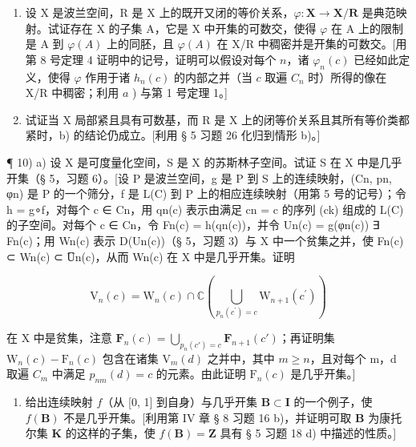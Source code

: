 \begin{enumerate}
\def\labelenumi{\alph{enumi})}
\setcounter{enumi}{1}
\item
  设 X 是波兰空间，R 是 X 上的既开又闭的等价关系，\(\varphi: \mathbf{X} \to \mathbf{X} / \mathbf{R}\) 是典范映射。试证存在 X 的子集 A，它是 X 中开集的可数交，使得 \(\varphi\) 在 A 上的限制是 A 到 \(\varphi(A)\) 上的同胚，且 \(\varphi(A)\) 在 X/R 中稠密并是开集的可数交。{[}用第 8 号定理 4 证明中的记号，证明可以假设对每个 \(n\)，诸 \(\varphi_n(c)\) 已经如此定义，使得 \(\varphi\) 作用于诸 \(h_n(c)\) 的内部之并（当 \(c\) 取遍 \(C_n\) 时）所得的像在 X/R 中稠密；利用 \(a\) ) 与第 1 号定理 1。{]}
\item
  试证当 X 局部紧且具有可数基，而 R 是 X 上的闭等价关系且其所有等价类都紧时，b) 的结论仍成立。{[}利用 § 5 习题 26 化归到情形 b)。{]}
\end{enumerate}

¶ 10) a) 设 X 是可度量化空间，S 是 X 的苏斯林子空间。试证 S 在 X 中是几乎开集（§ 5，习题 6）。{[}设 P 是波兰空间，g 是 P 到 S 上的连续映射，(Cn, pn, φn) 是 P 的一个筛分，f 是 L(C) 到 P 上的相应连续映射（用第 5 号的记号）；令 h = g∘f，对每个 c ∈ Cn，用 qn(c) 表示由满足 cn = c 的序列 (ck) 组成的 L(C) 的子空间。对每个 c ∈ Cn，令 Fn(c) = h(qn(c))，并令 Un(c) = g(φn(c)) ∃ Fn(c)；用 Wn(c) 表示 D(Un(c))（§ 5，习题 3）与 X 中一个贫集之并，使 Fn(c) ⊂ Wn(c) ⊂ U̅n(c)，从而 Wn(c) 在 X 中是几乎开集。证明

\[
\mathrm{V} _ {n} (c) = \mathrm{W} _ {n} (c) \cap \mathbb {C} \left(\bigcup_ {p _ {n} \left(c ^ {\prime}\right) = c} \mathrm{W} _ {n + 1} \left(c ^ {\prime}\right)\right)
\]

在 X 中是贫集，注意 \(\mathbf{F}_n(c) = \bigcup_{p_n(c') = c}\mathbf{F}_{n + 1}(c')\)；再证明集 \(\mathrm{W}_{n}(c)-\mathrm{F}_{n}(c)\) 包含在诸集 \(\mathrm{V}_{m}(d)\) 之并中，其中 \(m\geqslant n\)，且对每个 m，d 取遍 \(C_{m}\) 中满足 \(p_{nm}(d)=c\) 的元素。由此证明 \(\mathrm{F}_{n}(c)\) 是几乎开集。{]}

\begin{enumerate}
\def\labelenumi{\alph{enumi})}
\setcounter{enumi}{1}
\tightlist
\item
  给出连续映射 \(f\)（从 {[}0, 1{]} 到自身）与几乎开集 \(\mathbf{B} \subset \mathbf{I}\) 的一个例子，使 \(f(\mathbf{B})\) 不是几乎开集。{[}利用第 IV 章 § 8 习题 16 b)，并证明可取 \(\mathbf{B}\) 为康托尔集 \(\mathbf{K}\) 的这样的子集，使 \(f(\mathbf{B}) = \mathbf{Z}\) 具有 § 5 习题 18 d) 中描述的性质。{]}
\end{enumerate}

